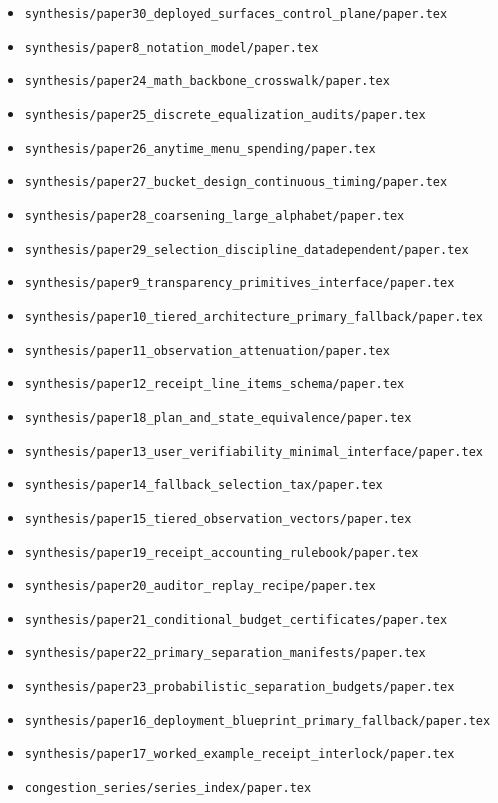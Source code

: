 \documentclass[11pt]{article}
\begin{document}
\begin{itemize}[leftmargin=*]
\item \texttt{synthesis/paper30\_deployed\_surfaces\_control\_plane/paper.tex}
\item \texttt{synthesis/paper8\_notation\_model/paper.tex}
\item \texttt{synthesis/paper24\_math\_backbone\_crosswalk/paper.tex}
\item \texttt{synthesis/paper25\_discrete\_equalization\_audits/paper.tex}
\item \texttt{synthesis/paper26\_anytime\_menu\_spending/paper.tex}
\item \texttt{synthesis/paper27\_bucket\_design\_continuous\_timing/paper.tex}
\item \texttt{synthesis/paper28\_coarsening\_large\_alphabet/paper.tex}
\item \texttt{synthesis/paper29\_selection\_discipline\_datadependent/paper.tex}
\item \texttt{synthesis/paper9\_transparency\_primitives\_interface/paper.tex}
\item \texttt{synthesis/paper10\_tiered\_architecture\_primary\_fallback/paper.tex}
\item \texttt{synthesis/paper11\_observation\_attenuation/paper.tex}
\item \texttt{synthesis/paper12\_receipt\_line\_items\_schema/paper.tex}
\item \texttt{synthesis/paper18\_plan\_and\_state\_equivalence/paper.tex}
\item \texttt{synthesis/paper13\_user\_verifiability\_minimal\_interface/paper.tex}
\item \texttt{synthesis/paper14\_fallback\_selection\_tax/paper.tex}
\item \texttt{synthesis/paper15\_tiered\_observation\_vectors/paper.tex}
\item \texttt{synthesis/paper19\_receipt\_accounting\_rulebook/paper.tex}
\item \texttt{synthesis/paper20\_auditor\_replay\_recipe/paper.tex}
\item \texttt{synthesis/paper21\_conditional\_budget\_certificates/paper.tex}
\item \texttt{synthesis/paper22\_primary\_separation\_manifests/paper.tex}
\item \texttt{synthesis/paper23\_probabilistic\_separation\_budgets/paper.tex}
\item \texttt{synthesis/paper16\_deployment\_blueprint\_primary\_fallback/paper.tex}
\item \texttt{synthesis/paper17\_worked\_example\_receipt\_interlock/paper.tex}
\item \texttt{congestion\_series/series\_index/paper.tex}
\end{itemize}
\end{document}
